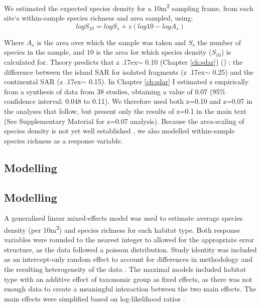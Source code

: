 We estimated the expected species density for a 10m\textsuperscript{2} sampling frame, from each site`s within-sample species richness and area sampled, using: 
\begin{equation}
log S_{10} = log S_s + z(log 10 - log A_s)
\end{equation}


Where $A_s$ is the area over which the sample was taken and $S_s$ the number of species in the sample, and $10$ is the area for which species density ($S_{10}$) is calculated for. Theory predicts that z {\raise.17ex\hbox{$\scriptstyle\sim$}} 0.10 
\ifappendixStyle %
(Chapter \ref{ch:sdar})%
\else
(\citealt{Phillips:2015sdar})
\fi
: the difference between the island SAR for isolated fragments (z {\raise.17ex\hbox{$\scriptstyle\sim$}} 0.25) and the continental SAR (z {\raise.17ex\hbox{$\scriptstyle\sim$}} 0.15). 
\ifappendixStyle %
In Chapter \ref{ch:sdar} I %
\else
\cite{Phillips:2015sdar} 
\fi
estimated z empirically from a synthesis of data from 38 studies, obtaining a value of 0.07 (95\% confidence interval: 0.048 to 0.11). We therefore used both z=0.10 and z=0.07 in the analyses that follow, but present only the results of z=0.1 in the main text (See Supplementary Material for z=0.07 analysis).  Because the area-scaling of species density is not yet well established \citep[e.g.][]{Giladi:2014bio}, we also modelled within-sample species richness as a response variable.

\ifappendixStyle %
\subsection{Modelling}%
\else
\subsection*{Modelling}
\fi

A generalised linear mixed-effects model was used to estimate average species density (per 10m\textsuperscript{2}) and species richness for each habitat type. Both response variables were rounded to the nearest integer to allowed for the appropriate error structure, as the data followed a poisson distribution. Study identity was included as an intercept-only random effect to account for differences in methodology and the resulting heterogeneity of the data \citep{Zuur:2009me}. The maximal models included habitat type with an additive effect of taxonomic group as fixed effects, as there was not enough data to create a meaningful interaction between the two main effects. The main effects were simplified based on log-likelihood ratios \citep{Zuur:2009me,Crawley:2012r}.

